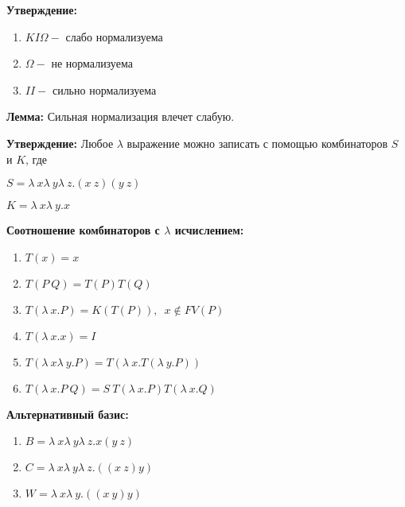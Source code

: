 \documentclass[12pt, a4paper]{article}
\begin{document}
	 \textbf{Утверждение:} 
	 \begin{enumerate}
	 	\item $KI\Omega-$ слабо нормализуема
	 	\item $\Omega-$ не нормализуема
	 	\item $II-$ сильно нормализуема
	 \end{enumerate}
	 \textbf{Лемма:} Сильная нормализация влечет слабую.\par
	 \textbf{Утверждение:} Любое $\lambda$ выражение можно записать с помощью комбинаторов $S$ и $K$, где\par 
	 $S=\lambda\:x\lambda\:y\lambda\:z.(x\:z)(y\:z)$\par 
	 $K=\lambda\:x\lambda\:y.x$\par 
	\textbf{Соотношение комбинаторов с $\lambda$ исчислением:}
	\begin{enumerate}
		\item $T(x)=x$
		\item $T(P\:Q)=T(P)T(Q)$
		\item $T(\lambda\:x.P)=K(T(P)),\enspace x\not\in FV(P)$
		\item $T(\lambda\:x.x)=I$
		\item $T(\lambda\:x\lambda\:y.P)=T(\lambda\:x.T(\lambda\:y.P))$
		\item $T(\lambda\:x.P\:Q)=S\:T(\lambda\:x.P)T(\lambda\:x.Q)$
	\end{enumerate}		
	 \textbf{Альтернативный базис:}
	 \begin{enumerate}
		\item $B=\lambda\:x\lambda\:y\lambda\:z.x(y\:z)$
		\item $C=\lambda\:x\lambda\:y\lambda\:z.((x\:z)y)$
		\item $W=\lambda\:x\lambda\:y.((x\:y)y)$
	 \end{enumerate}
\end{document}
